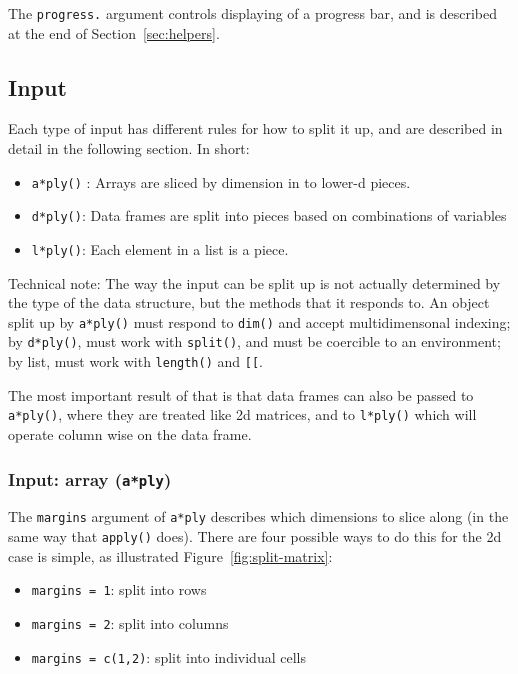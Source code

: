 \documentclass[letterpage]{scrartcl}
\newcommand{\code}[1]{\lstinline!#1!}
\newcommand{\f}[1]{\lstinline!#1()!}
\begin{document}
The {\tt progress.} argument controls displaying of a progress bar, and is described at the end of Section~\ref{sec:helpers}.

\subsection{Input} 
\label{sec:input}

Each type of input has different rules for how to split it up, and are described in detail in the following section. In short:

\begin{itemize}
  \item \f{a*ply} : Arrays are sliced by dimension in to lower-d pieces. 
  
  \item \f{d*ply}: Data frames are split into pieces based on combinations of variables
  
  \item \f{l*ply}: Each element in a list is a piece.
  
\end{itemize}

Technical note: The way the input can be split up is not actually determined by the type of the data structure, but the methods that it responds to.  An object split up by \f{a*ply} must respond to \f{dim} and accept multidimensonal indexing; by \f{d*ply}, must work with \f{split}, and must be coercible to an environment; by list, must work with \f{length} and \code{[[}.

The most important result of that is that data frames can also be passed to \f{a*ply}, where they are treated like 2d matrices, and to \f{l*ply} which will operate column wise on the data frame.

\subsubsection{Input: array ({\tt a*ply})}

The {\tt margins} argument of {\tt a*ply} describes which dimensions to slice along (in the same way that \f{apply} does).  There are four possible ways to do this for the 2d case is simple, as illustrated Figure~\ref{fig:split-matrix}:

\begin{itemize}
  \item \code{margins = 1}: split into rows
  \item \code{margins = 2}: split into columns
  \item \code{margins = c(1,2)}: split into individual cells
\end{itemize}
\end{document}
